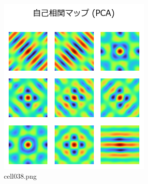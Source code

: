 \begin{figure}[ht]
	\centering
	\includegraphics[scale=0.8, max width=\linewidth]{./fig/local-learning-rule/pca-hebbian-learning/cell038.png}
	\caption{cell038.png}
	\label{cell038.png}
\end{figure}